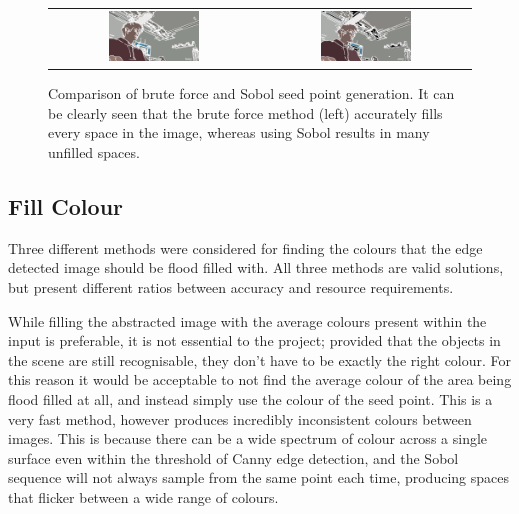 \begin{figure}[H]
    \begin{center}
    \begin{tabular}{ c c }
        \includegraphics[width=0.45\textwidth]{Figures/Brute.jpg} &
        \includegraphics[width=0.45\textwidth]{Figures/Sobol.jpg}
    \end{tabular}
    \caption[Comparison of brute force and Sobol seed point generation]{Comparison of brute force and Sobol seed point generation. It can be clearly seen that the brute force method (left) accurately fills every space in the image, whereas using Sobol results in many unfilled spaces.}
    \label{fig:BrutevsSobol}
    \end{center}
\end{figure}

\subsection{Fill Colour}

Three different methods were considered for finding the colours that the edge detected image should be flood filled with. All three methods are valid solutions, but present different ratios between accuracy and resource requirements.

While filling the abstracted image with the average colours present within the input is preferable, it is not essential to the project; provided that the objects in the scene are still recognisable, they don't have to be exactly the right colour. For this reason it would be acceptable to not find the average colour of the area being flood filled at all, and instead simply use the colour of the seed point. This is a very fast method, however produces incredibly inconsistent colours between images. This is because there can be a wide spectrum of colour across a single surface even within the threshold of Canny edge detection, and the Sobol sequence will not always sample from the same point each time, producing spaces that flicker between a wide range of colours.

